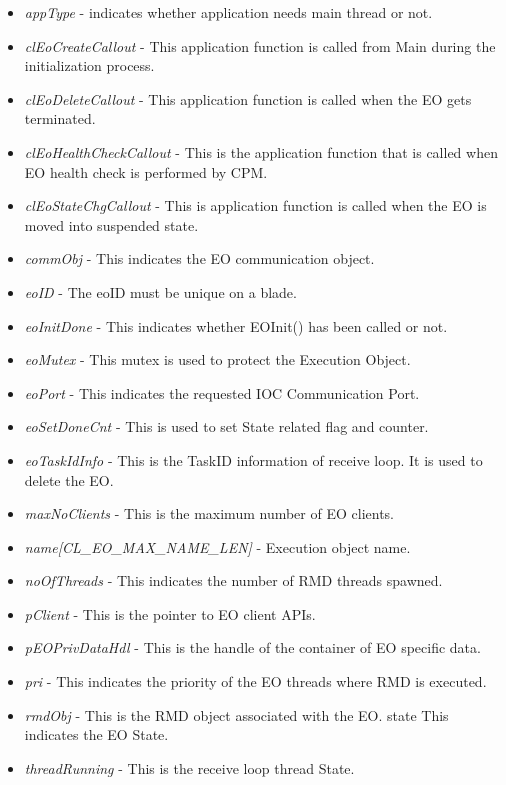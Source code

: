  \begin{itemize}
 \item
 \textit{appType} - indicates whether application needs main thread or not.
\item \textit{clEoCreateCallout} - This application function is called from Main during the initialization process.
\item \textit{clEoDeleteCallout} - This application function is called when the EO gets terminated.
\item \textit{clEoHealthCheckCallout} - This is the application function that is called when EO health check is
performed by CPM.
\item \textit{clEoStateChgCallout} - This is application function is called when the EO is moved into suspended
state.
\item \textit{commObj} - This indicates the EO communication object.
\item \textit{eoID} - The eoID must be unique on a blade.
\item \textit{eoInitDone} - This indicates whether EOInit() has been called or not.
\item \textit{eoMutex} - This mutex is used to protect the Execution Object.
\item \textit{eoPort} - This indicates the requested IOC Communication Port.
\item \textit{eoSetDoneCnt} - This is used to set State related flag and counter.
\item \textit{eoTaskIdInfo} - This is the TaskID information of receive loop. It is used to delete the EO.
\item \textit{maxNoClients} - This is the maximum number of EO clients.
\item \textit{name\mbox{[}CL\_\-EO\_\-MAX\_\-NAME\_\-LEN\mbox{]}} - Execution object name.
\item \textit{noOfThreads} - This indicates the number of RMD threads spawned.
\item \textit{pClient} - This is the pointer to EO client APIs.
\item \textit{pEOPrivDataHdl} - This is the handle of the container of EO specific data.
\item \textit{pri} - This indicates the priority of the EO threads where RMD is executed.
\item \textit{rmdObj} - This is the RMD object associated with the EO.
state This indicates the EO State.
\item \textit{threadRunning} - This is the receive loop thread State.
\end{itemize}


